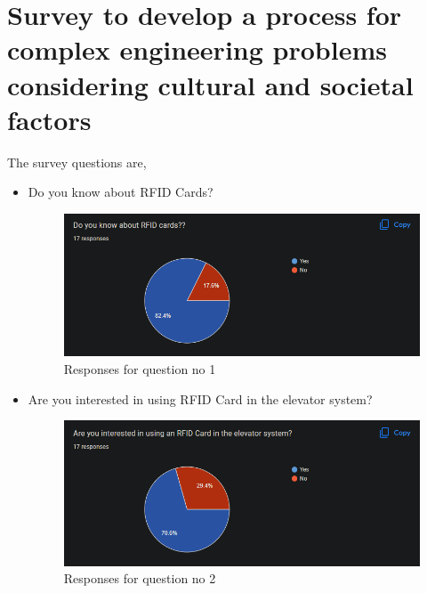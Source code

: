 \documentclass{lxaiproposal}
\begin{document}
\section{Survey to develop a process for complex engineering problems considering cultural and societal factors }
\vspace*{-3mm}
The survey questions are,
\begin{itemize}
    \item Do you know about RFID Cards?
          \begin{figure} [h!]
              \centering
              \includegraphics[width=1\linewidth]{images/Q1.png}
              \caption{Responses for question no 1}
              \label{fig:my-fig}
          \end{figure}
    \item Are you interested in using RFID Card in the elevator system?
          \begin{figure} [h!]
              \centering
              \includegraphics[width=1\linewidth]{images/Q2.png}
              \caption{Responses for question no 2}
              \label{fig:my-fig}
          \end{figure}


\end{itemize}
\end{document}
